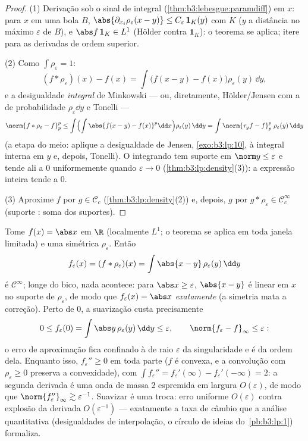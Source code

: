 \begin{proof}
(1) Derivação sob o sinal de integral (\cref{thm:b3:lebesgue:paramdiff}) em $x$: para
$x$ em uma bola $B$, $\abs{\partial_{x_i}\rho_\varepsilon(x - y)} \leq
C_\varepsilon\,\mathbf 1_{K}(y)$ com $K$  ($y$ a
distância no máximo $\varepsilon$ de $B$), e $\abs f\,\mathbf 1_K \in L^1$ (Hölder contra $\mathbf 1_K$): o
teorema se aplica; itere para as derivadas de ordem superior.

(2) Como $\int\rho_\varepsilon = 1$:
\[
(f * \rho_\varepsilon)(x) - f(x)
= \int \bigl(f(x - y) - f(x)\bigr)\rho_\varepsilon(y)\,\dd y ,
\]
e a desigualdade \emph{integral} de Minkowski --- ou, diretamente,
Hölder/Jensen com a  de probabilidade $\rho_\varepsilon\dd y$ e Tonelli ---
\[
\norm{f*\rho_\varepsilon - f}_p^p
\leq \int\Bigl(\int\abs{f(x-y) -
f(x)}^p\dd x\Bigr)\rho_\varepsilon(y)\,\dd y
= \int \norm{\tau_yf - f}_p^p\;\rho_\varepsilon(y)\,\dd y
\]
(a etapa do meio: aplique a desigualdade de Jensen, \cref{exo:b3:lp:10}, à
integral interna em $y$ e, depois, Tonelli). O integrando tem
suporte em $\norm y \leq \varepsilon$ e tende ali a $0$ uniformemente quando $\varepsilon \to 0$
(\cref{thm:b3:lp:density}(3)): a expressão inteira tende a $0$.

(3) Aproxime $f$ por $g \in \mathcal C_c$ (\cref{thm:b3:lp:density}(2)) e, depois, $g$
por $g *
\rho_\varepsilon \in \mathcal C_c^\infty$ (suporte : soma dos suportes).
\end{proof}

\begin{example}
\label{ex:b3:lp:mollifyexample}
Tome $f(x) = \abs x$ em $\R$ (localmente $L^1$; o teorema se aplica em
toda janela limitada) e uma  simétrica $\rho_\varepsilon$.
Então
\[
f_\varepsilon(x) = (f * \rho_\varepsilon)(x)
= \int\abs{x - y}\,\rho_\varepsilon(y)\,\dd y
\]
é $\mathcal C^\infty$; longe do bico, nada acontece: para $\abs x \geq \varepsilon$, $\abs{x - y}$ é linear em
$x$ no suporte de $\rho_\varepsilon$, de modo que $f_\varepsilon(x) =
\abs x$ \emph{exatamente} (a
simetria mata a correção). Perto de $0$, a suavização custa
precisamente
\[
0 \leq f_\varepsilon(0) = \int\abs
y\,\rho_\varepsilon(y)\,\dd y \leq \varepsilon,
\qquad
\norm{f_\varepsilon - f}_\infty \leq \varepsilon :
\]
o erro de aproximação fica confinado à  de raio $\varepsilon$ da
singularidade e é da ordem dela. Enquanto isso, $f_\varepsilon'' \geq 0$ em toda parte
($f$ é convexa, e a convolução com $\rho_\varepsilon
\geq 0$ preserva a convexidade),
com $\int f_\varepsilon'' =
f_\varepsilon'(\infty) - f_\varepsilon'(-\infty) = 2$: a segunda derivada é uma onda de massa $2$ espremida em
largura $O(\varepsilon)$, de modo que $\norm{f_\varepsilon''}_\infty \gtrsim
\varepsilon^{-1}$. Suavizar é uma troca: erro uniforme
$O(\varepsilon)$ contra explosão da derivada $O(\varepsilon^{-1})$ --- exatamente a taxa de câmbio
que a análise quantitativa (desigualdades de interpolação, o círculo de
ideias do~\cref{pb:b3:lp:1}) formaliza.
\end{example}

